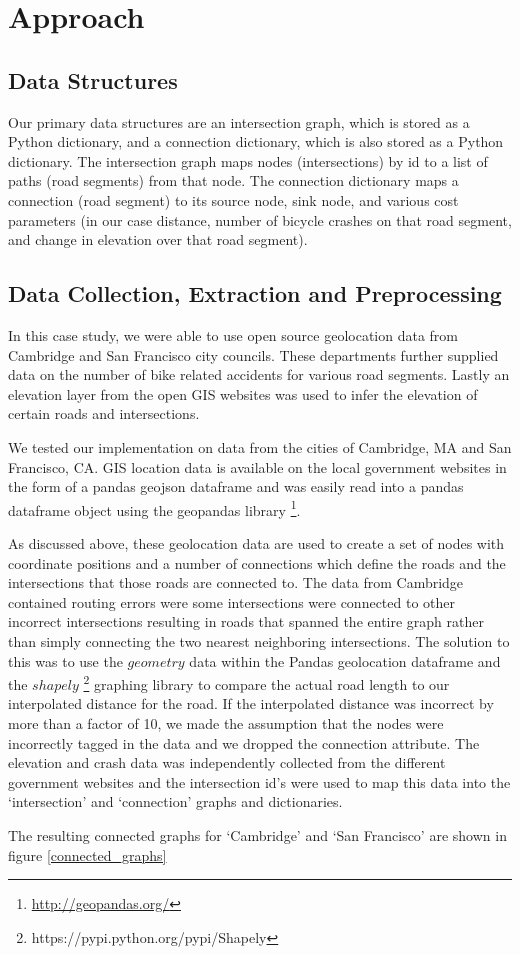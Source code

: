 \documentclass[11pt]{article}
\begin{document}
\section{Approach}
\subsection{Data Structures}
Our primary data structures are an intersection graph, which is stored as a Python dictionary, and a connection dictionary, which is also stored as a Python dictionary. The intersection graph maps nodes (intersections) by id to a list of paths (road segments) from that node. The connection dictionary maps a connection (road segment) to its source node, sink node, and various cost parameters (in our case distance, number of bicycle crashes on that road segment, and change in elevation over that road segment).

\subsection{Data Collection, Extraction and Preprocessing}
In this case study, we were able to use open source geolocation data from Cambridge and San Francisco city councils. These departments further supplied data on the number of bike related accidents for various road segments. Lastly an elevation layer from the open GIS websites was used to infer the elevation of certain roads and intersections.

We tested our implementation on data from the cities of Cambridge, MA and San Francisco, CA. GIS location data is available on the local government websites in the form of a pandas geojson dataframe and was easily read into a pandas dataframe object using the geopandas library \footnote{\url{http://geopandas.org/}}.
\par
As discussed above, these geolocation data are used to create a set of nodes with coordinate positions and a number of connections which define the roads and the intersections that those roads are connected to. The data from Cambridge contained routing errors were some intersections were connected to other incorrect intersections resulting in roads that spanned the entire graph rather than simply connecting the two nearest neighboring intersections. The solution to this was to use the $geometry$ data within the Pandas geolocation dataframe and the $shapely$ \footnote{https://pypi.python.org/pypi/Shapely} graphing library to compare the actual road length to our interpolated distance for the road. If the interpolated distance was incorrect by more than a factor of 10, we made the assumption that the nodes were incorrectly tagged in the data and we dropped the connection attribute. The elevation and crash data was independently collected from the different government websites and the intersection id's were used to map this data into the `intersection' and `connection' graphs and dictionaries.
\par The resulting connected graphs for `Cambridge' and `San Francisco' are shown in figure \ref{connected_graphs}
\end{document}

